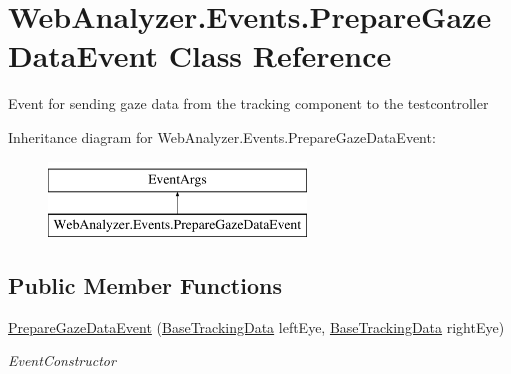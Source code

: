 \hypertarget{class_web_analyzer_1_1_events_1_1_prepare_gaze_data_event}{}\section{Web\+Analyzer.\+Events.\+Prepare\+Gaze\+Data\+Event Class Reference}
\label{class_web_analyzer_1_1_events_1_1_prepare_gaze_data_event}


Event for sending gaze data from the tracking component to the testcontroller  


Inheritance diagram for Web\+Analyzer.\+Events.\+Prepare\+Gaze\+Data\+Event\+:\begin{figure}[H]
\begin{center}
\leavevmode
\includegraphics[height=2.000000cm]{class_web_analyzer_1_1_events_1_1_prepare_gaze_data_event}
\end{center}
\end{figure}
\subsection*{Public Member Functions}
\begin{DoxyCompactItemize}
\item 
\hyperlink{class_web_analyzer_1_1_events_1_1_prepare_gaze_data_event_a32284ed19ddefa066e42baa6cabded49}{Prepare\+Gaze\+Data\+Event} (\hyperlink{class_web_analyzer_1_1_models_1_1_base_1_1_base_tracking_data}{Base\+Tracking\+Data} left\+Eye, \hyperlink{class_web_analyzer_1_1_models_1_1_base_1_1_base_tracking_data}{Base\+Tracking\+Data} right\+Eye)
\begin{DoxyCompactList}\small\item\em Event\+Constructor \end{DoxyCompactList}\end{DoxyCompactItemize}
